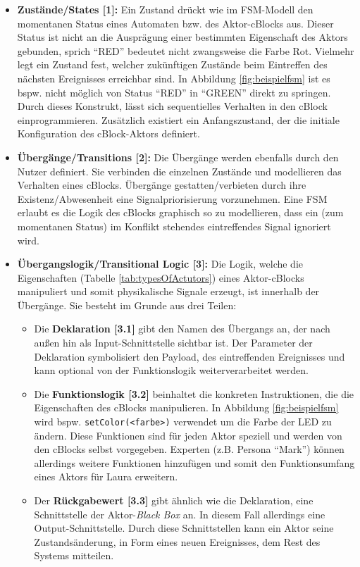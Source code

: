 \begin{itemize}
    \item \textbf{Zustände/States [1]:} Ein Zustand drückt wie im \ac{FSM}-Modell den momentanen Status eines Automaten bzw. des Aktor-cBlocks aus. Dieser Status ist nicht an die Ausprägung einer bestimmten Eigenschaft des Aktors gebunden, sprich "`RED"' bedeutet nicht zwangsweise die Farbe Rot. Vielmehr legt ein Zustand fest, welcher zukünftigen Zustände beim Eintreffen des nächsten Ereignisses erreichbar sind. In Abbildung \ref{fig:beispielfsm} ist es bspw. nicht möglich von Status "`RED"' in "`GREEN"' direkt zu springen. Durch dieses Konstrukt, lässt sich sequentielles Verhalten in den cBlock einprogrammieren. Zusätzlich existiert ein Anfangszustand, der die initiale Konfiguration des cBlock-Aktors definiert.
    \item \textbf{Übergänge/Transitions [2]:} Die Übergänge werden ebenfalls durch den Nutzer definiert. Sie verbinden die einzelnen Zustände und modellieren das Verhalten eines cBlocks. Übergänge gestatten/verbieten durch ihre Existenz/Abwesenheit eine Signalpriorisierung vorzunehmen. Eine \ac{FSM} erlaubt es die Logik des cBlocks graphisch so zu modellieren, dass ein (zum momentanen Status) im Konflikt stehendes eintreffendes Signal ignoriert wird.
    \item \textbf{Übergangslogik/Transitional Logic [3]:} Die Logik, welche die Eigenschaften (Tabelle
\ref{tab:typesOfActutors}) eines Aktor-cBlocks manipuliert und somit physikalische Signale erzeugt, ist innerhalb der Übergänge. Sie besteht im Grunde aus drei Teilen:
    \begin{itemize}
        \item Die \textbf{Deklaration [3.1]} gibt den Namen des Übergangs an, der nach außen hin als Input-Schnittstelle sichtbar ist. Der Parameter der Deklaration symbolisiert den Payload, des eintreffenden Ereignisses und kann optional von der Funktionslogik weiterverarbeitet werden.
        \item Die \textbf{Funktionslogik [3.2]} beinhaltet die konkreten Instruktionen, die die Eigenschaften des cBlocks manipulieren. In Abbildung \ref{fig:beispielfsm} wird bspw. \texttt{setColor(<farbe>)} verwendet um die Farbe der LED zu ändern. Diese Funktionen sind für jeden Aktor speziell und werden von den cBlocks selbst vorgegeben. Experten (z.B. Persona "`Mark"') können allerdings weitere Funktionen hinzufügen und somit den Funktionsumfang eines Aktors für Laura erweitern.
        \item Der \textbf{Rückgabewert [3.3]} gibt ähnlich wie die Deklaration, eine Schnittstelle der Aktor-\textit{Black Box} an. In diesem Fall allerdings eine Output-Schnittstelle. Durch diese Schnittstellen kann ein Aktor seine Zustandsänderung, in Form eines neuen Ereignisses, dem Rest des Systems mitteilen. 
    \end{itemize}
\end{itemize}

